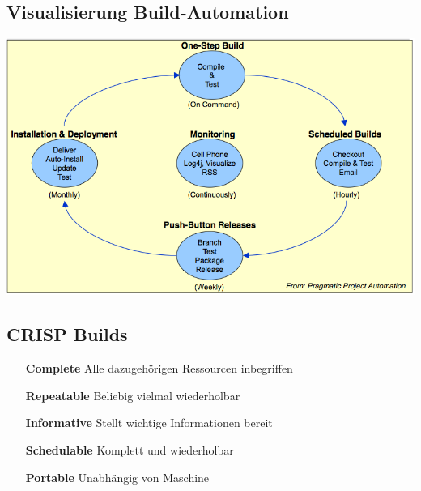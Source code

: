 \documentclass[a4paper,10pt]{article}
\newcommand{\Bold}[1]{\textbf{#1}} %
\begin{document}
\subsection{Visualisierung Build-Automation}
\includegraphics[scale=0.6]{build_automation.png}

\subsection{CRISP Builds}
\begin{itemize}
	\item[\Bold {Complete}] Alle dazugehörigen Ressourcen inbegriffen
	\item[\Bold {Repeatable}] Beliebig vielmal wiederholbar
	\item[\Bold {Informative}] Stellt wichtige Informationen bereit
	\item[\Bold {Schedulable}] Komplett und wiederholbar
	\item[\Bold {Portable}] Unabhängig von Maschine
\end{itemize}
\end{document}
